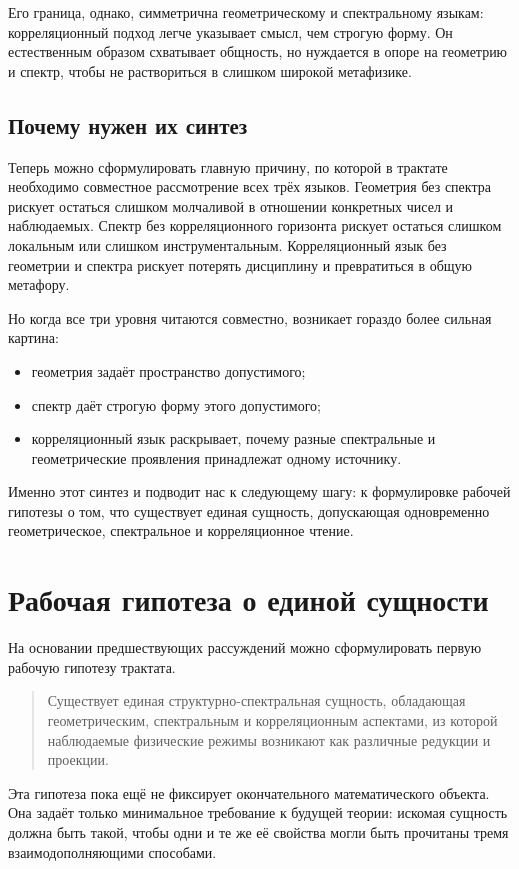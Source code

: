 \documentclass[12pt,a4paper]{article}
\begin{document}
Его граница, однако, симметрична геометрическому и спектральному языкам: корреляционный подход легче указывает смысл, чем строгую форму. Он естественным образом схватывает общность, но нуждается в опоре на геометрию и спектр, чтобы не раствориться в слишком широкой метафизике.

\subsection{Почему нужен их синтез}

Теперь можно сформулировать главную причину, по которой в трактате необходимо совместное рассмотрение всех трёх языков. Геометрия без спектра рискует остаться слишком молчаливой в отношении конкретных чисел и наблюдаемых. Спектр без корреляционного горизонта рискует остаться слишком локальным или слишком инструментальным. Корреляционный язык без геометрии и спектра рискует потерять дисциплину и превратиться в общую метафору.

Но когда все три уровня читаются совместно, возникает гораздо более сильная картина:
\begin{itemize}
    \item геометрия задаёт пространство допустимого;
    \item спектр даёт строгую форму этого допустимого;
    \item корреляционный язык раскрывает, почему разные спектральные и геометрические проявления принадлежат одному источнику.
\end{itemize}

Именно этот синтез и подводит нас к следующему шагу: к формулировке рабочей гипотезы о том, что существует единая сущность, допускающая одновременно геометрическое, спектральное и корреляционное чтение.

\section{Рабочая гипотеза о единой сущности}

На основании предшествующих рассуждений можно сформулировать первую рабочую гипотезу трактата.

\begin{quote}
Существует единая структурно-спектральная сущность, обладающая геометрическим, спектральным и корреляционным аспектами, из которой наблюдаемые физические режимы возникают как различные редукции и проекции.
\end{quote}

Эта гипотеза пока ещё не фиксирует окончательного математического объекта. Она задаёт только минимальное требование к будущей теории: искомая сущность должна быть такой, чтобы одни и те же её свойства могли быть прочитаны тремя взаимодополняющими способами.
\end{document}
